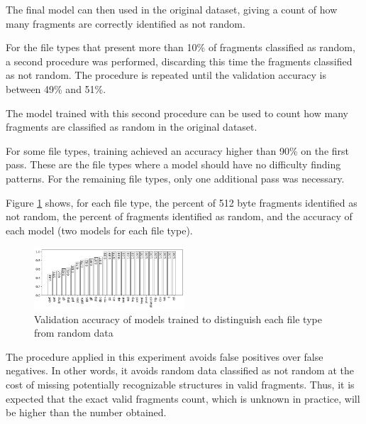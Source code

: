 The final model can then used in the original dataset, giving a count of how many fragments are correctly identified as not random.

For the file types that present more than 10\% of fragments classified as random, a second procedure was performed, discarding this time the fragments classified as not random. The procedure is repeated until the validation accuracy is between 49\% and 51\%.

The model trained with this second procedure can be used to count how many fragments are classified as random in the original dataset.

For some file types, training achieved an accuracy higher than 90\% on the first pass. These are the file types where a model should have no difficulty finding patterns. For the remaining file types, only one additional pass was necessary.

Figure \ref{fig:not_random} shows, for each file type, the percent of 512 byte fragments identified as not random, the percent of fragments identified as random, and the accuracy of each model (two models for each file type).

\noindent
\begin{figure}[htb!]
\centering\includegraphics[width=0.50\textwidth]{content/random.png}
\caption{\label{fig:not_random}Validation accuracy of models trained to distinguish each file type from random data}%
\end{figure}



The procedure applied in this experiment avoids false positives over false negatives. In other words, it avoids random data classified as not random at the cost of missing potentially recognizable structures in valid fragments. Thus, it is expected that the exact valid fragments count, which is unknown in practice, will be higher than the number obtained.


